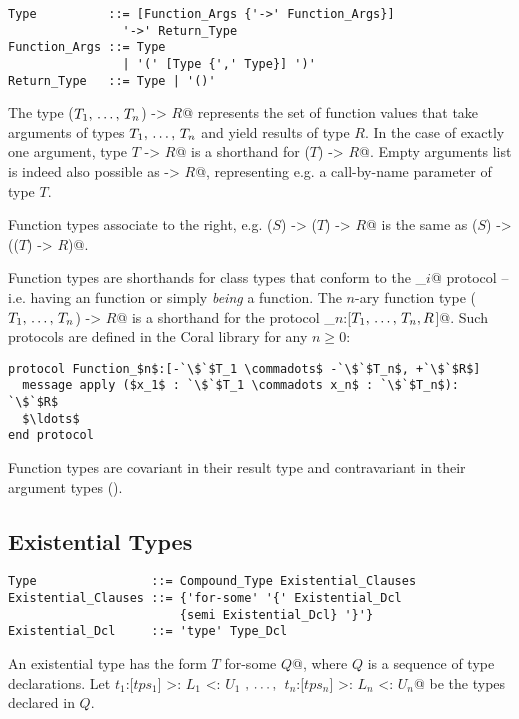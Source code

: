 \syntax\begin{lstlisting}
Type          ::= [Function_Args {'->' Function_Args}] 
                '->' Return_Type
Function_Args ::= Type
                | '(' [Type {',' Type}] ')'
Return_Type   ::= Type | '()'
\end{lstlisting}

The type \lstinline@($T_1 ,\, \ldots ,\, T_n$) -> $R$@ represents the set of function values that take arguments of types $T_1 ,\, \ldots ,\, T_n$ and yield results of type $R$. In the case of exactly one argument, type \lstinline@$T$ -> $R$@ is a shorthand for \lstinline@($T$) -> $R$@. Empty arguments list is indeed also possible as \lstinline@-> $R$@, representing e.g. a call-by-name parameter of type $T$.

Function types associate to the right, e.g. \lstinline@($S$) -> ($T$) -> $R$@ is the same as \lstinline@($S$) -> (($T$) -> $R$)@. 

Function types are shorthands for class types that conform to the \lstinline@Function_$i$@ protocol -- i.e. having an  function or simply {\em being} a function. The $n$-ary function type \lstinline@($T_1 ,\, \ldots ,\, T_n$) -> $R$@ is a shorthand for the protocol \lstinline@Function_$n$:[$T_1 ,\, \ldots ,\, T_n,R$]@. Such protocols are defined in the Coral library for any $n \ge 0$:

\begin{lstlisting}[escapechar=`]
protocol Function_$n$:[-`\$`$T_1 \commadots$ -`\$`$T_n$, +`\$`$R$]
  message apply ($x_1$ : `\$`$T_1 \commadots x_n$ : `\$`$T_n$): `\$`$R$
  $\ldots$
end protocol
\end{lstlisting}

Function types are covariant in their result type and contravariant in their argument types ().

\subsection{Existential Types}
\label{sec:existential-types}

\syntax\begin{lstlisting}[escapechar=@]
Type                ::= Compound_Type Existential_Clauses
Existential_Clauses ::= {'for-some' '{' Existential_Dcl
                        {semi Existential_Dcl} '}'}
Existential_Dcl     ::= 'type' Type_Dcl
\end{lstlisting}

An existential type has the form \lstinline@$T$ for-some {$Q$}@, where $Q$ is a sequence of type declarations. Let \lstinline@$t_1$:[$tps_1$] >: $L_1$ <: $U_1$ $,\, \ldots ,\,$ $t_n$:[$tps_n$] >: $L_n$ <: $U_n$@ be the types declared in $Q$. 

